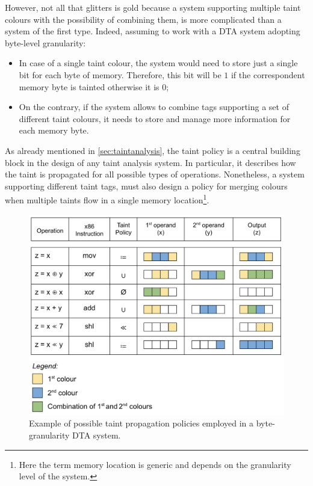 \documentclass[LaM,binding=0.6cm]{sapthesis}
\begin{document}
\newpage
\noindent
However, not all that glitters is gold because a system supporting multiple taint colours with the possibility of combining them, is more complicated than a system of the first type. Indeed, assuming to work with a DTA system adopting byte-level granularity:
\begin{itemize}
\item In case of a single taint colour, the system would need to store just a single bit for each byte of memory. Therefore, this bit will be $1$ if the correspondent memory byte is tainted otherwise it is $0$;
\item On the contrary, if the system allows to combine tags supporting a set of different taint colours, it needs to store and manage more information for each memory byte.
\end{itemize}
As already mentioned in \autoref{sec:taintanalysis}, the taint policy is a central building block in the design of any taint analysis system. In particular, it describes how the taint is propagated for all possible types of operations. Nonetheless, a system supporting different taint tags, must also design a policy for merging colours when multiple taints flow in a single memory location\footnote{Here the term memory location is generic and depends on the granularity level of the system.}.

\begin{figure}[h!]
\centering
\includegraphics[scale=.6]{images/techn5}
\caption{Example of possible taint propagation policies employed in a byte-granularity DTA system.}
\label{fig:techn5}
\end{figure}
\end{document}
